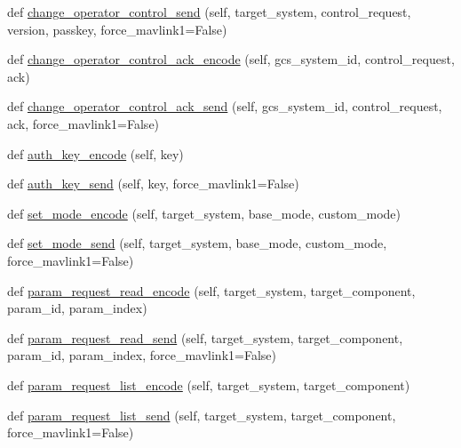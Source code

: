 \begin{DoxyCompactItemize}
\item 
def \hyperlink{classpymavlink_1_1dialects_1_1v10_1_1MAVLink_ab004eca22848e70c1ae6efcb573f31ce}{change\+\_\+operator\+\_\+control\+\_\+send} (self, target\+\_\+system, control\+\_\+request, version, passkey, force\+\_\+mavlink1=False)
\item 
def \hyperlink{classpymavlink_1_1dialects_1_1v10_1_1MAVLink_a4f0c16287a7c463e5afc47379a2d3ca1}{change\+\_\+operator\+\_\+control\+\_\+ack\+\_\+encode} (self, gcs\+\_\+system\+\_\+id, control\+\_\+request, ack)
\item 
def \hyperlink{classpymavlink_1_1dialects_1_1v10_1_1MAVLink_af2f8fd2b964c727170e288d9bf970980}{change\+\_\+operator\+\_\+control\+\_\+ack\+\_\+send} (self, gcs\+\_\+system\+\_\+id, control\+\_\+request, ack, force\+\_\+mavlink1=False)
\item 
def \hyperlink{classpymavlink_1_1dialects_1_1v10_1_1MAVLink_ac3e72afcee8bef673f1cfedbc5ffe5bd}{auth\+\_\+key\+\_\+encode} (self, key)
\item 
def \hyperlink{classpymavlink_1_1dialects_1_1v10_1_1MAVLink_a306d71f9617edd98b2a39eb6434acd8a}{auth\+\_\+key\+\_\+send} (self, key, force\+\_\+mavlink1=False)
\item 
def \hyperlink{classpymavlink_1_1dialects_1_1v10_1_1MAVLink_a9c24acae219f90628cfb9118892539bc}{set\+\_\+mode\+\_\+encode} (self, target\+\_\+system, base\+\_\+mode, custom\+\_\+mode)
\item 
def \hyperlink{classpymavlink_1_1dialects_1_1v10_1_1MAVLink_a8c39cfe5b1f4cd429e93a213d52597d0}{set\+\_\+mode\+\_\+send} (self, target\+\_\+system, base\+\_\+mode, custom\+\_\+mode, force\+\_\+mavlink1=False)
\item 
def \hyperlink{classpymavlink_1_1dialects_1_1v10_1_1MAVLink_ae3cf2e242635eeeb125658f49bb0c7ec}{param\+\_\+request\+\_\+read\+\_\+encode} (self, target\+\_\+system, target\+\_\+component, param\+\_\+id, param\+\_\+index)
\item 
def \hyperlink{classpymavlink_1_1dialects_1_1v10_1_1MAVLink_aa779f95800086fdff06728e8cb932076}{param\+\_\+request\+\_\+read\+\_\+send} (self, target\+\_\+system, target\+\_\+component, param\+\_\+id, param\+\_\+index, force\+\_\+mavlink1=False)
\item 
def \hyperlink{classpymavlink_1_1dialects_1_1v10_1_1MAVLink_a7b715eab2da8bdd1cea6a2d0759b3af0}{param\+\_\+request\+\_\+list\+\_\+encode} (self, target\+\_\+system, target\+\_\+component)
\item 
def \hyperlink{classpymavlink_1_1dialects_1_1v10_1_1MAVLink_adf9061aaf3cb46971c010c10557e45a9}{param\+\_\+request\+\_\+list\+\_\+send} (self, target\+\_\+system, target\+\_\+component, force\+\_\+mavlink1=False)

\end{DoxyCompactItemize}
